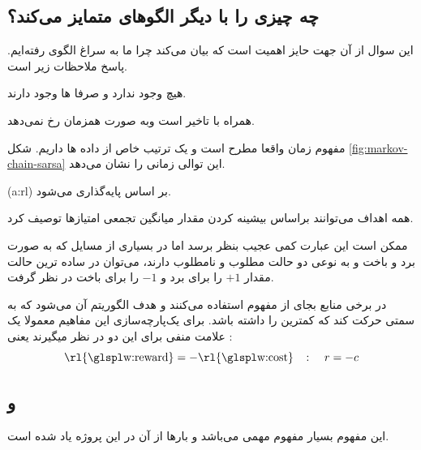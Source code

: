 \subsection[وجه تمایز 
\ws{rl}
از دیگر الگو‌های 
\ws{ml}
]{چه چیزی 
را با دیگر الگوهای 
متمایز می‌کند؟
}

این سوال از آن جهت حایز اهمیت است که بیان می‌کند چرا ما به سراغ الگوی 
رفته‌ایم. پاسخ ملاحظات زیر است.

\begin{alphabetlist}
\item هیچ 
وجود ندارد و صرفا ها وجود دارند.
\item 
{}
همراه با تاخیر است وبه صورت همزمان رخ نمی‌دهد.
\item 
مفهوم زمان واقعا مطرح است و یک ترتیب خاص از داده ها داریم.
شکل \ref{fig:markov-chain-sarsa} این توالی زمانی را نشان می‌دهد.
\end{alphabetlist}

(\gls{a:rl})
بر اساس  پایه‌گذاری می‌شود.
\begin{definition}[\w{rewardhypo}]
	همه اهداف می‌توانند براساس بیشینه کردن مقدار میانگین تجمعی امتیازها توصیف کرد.
\end{definition}

ممکن است این عبارت کمی عجیب بنظر برسد اما در بسیاری از مسایل که به صورت برد و باخت و به نوعی دو حالت مطلوب و نامطلوب دارند، می‌توان در ساده ترین حالت مقدار $+1$ را برای برد و $-1$ را برای باخت در نظر گرفت.

\begin{remark}
	در برخی منابع بجای  از مفهوم  استفاده می‌کنند و هدف الگوریتم آن می‌شود که به سمتی حرکت کند که کمترین  را داشته باشد. برای یک‌پارچه‌سازی این مفاهیم معمولا یک علامت منفی برای این دو در نظر میگیرند یعنی :
	\[	\text{\rl{\w{reward}}} = -\text{\rl{\w{cost}}}
		\quad \colon \quad
		r = -c
		\]
\end{remark}

\subsection{
 و 
}
 
 این مفهوم بسیار مفهوم مهمی می‌باشد و بارها از آن در این پروژه یاد شده است.
 
